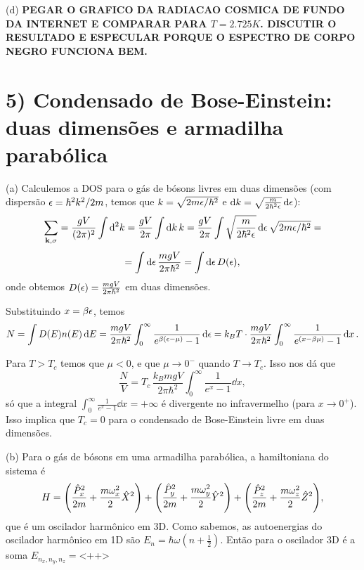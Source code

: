 \documentclass[a4paper,10pt]{article}
\begin{document}
\n\n

(d) \textbf{PEGAR O GRAFICO DA RADIACAO COSMICA DE FUNDO DA INTERNET E COMPARAR PARA $T = 2.725 \unit{K}$. DISCUTIR O RESULTADO E ESPECULAR PORQUE O ESPECTRO DE CORPO NEGRO FUNCIONA BEM.}


\pagebreak

\section*{5) Condensado de Bose-Einstein: duas dimensões e armadilha parabólica}

(a) Calculemos a DOS para o gás de bósons livres em duas dimensões (com dispersão $\epsilon = \hbar^2 k^2 / 2m$, temos que
$k = \sqrt{2m\epsilon/\hbar^2}$ e $\dd{k} = \sqrt{\frac{m}{2\hbar^2\epsilon}} \dd{\epsilon}$):
$$
\sum_{\vb{k}, \sigma} = \frac{g V}{(2\pi)^2} \int \dd[2] k = \frac{gV}{2\pi} \int \dd{k} k =
\frac{gV}{2\pi} \int \sqrt{\frac{m}{2\hbar^2\epsilon}} \dd{\epsilon} \sqrt{2m\epsilon/\hbar^2} =
$$
$$
= \int \dd{\epsilon} \frac{mgV}{2\pi \hbar^2} = \int \dd{\epsilon} D(\epsilon),
$$
onde obtemos $D(\epsilon) = \frac{mgV}{2\pi \hbar^2}$ em duas dimensões.

\n

Substituindo $x = \beta \epsilon$, temos
$$
N = \int D(E) n(E) \dd{E} = \frac{m g V}{2\pi \hbar^2} \int_0^{\infty} \frac{1}{e^{\beta (\epsilon-\mu)} - 1} \dd{\epsilon} =
k_B T \cdot \frac{m g V}{2\pi \hbar^2} \int_0^{\infty} \frac{1}{e^{(x - \beta\mu)} - 1} \dd{x}.
$$

\n

Para $T > T_c$ temos que $\mu < 0$, e que $\mu \to 0^-$ quando $T \to T_c$. Isso nos dá que
$$
\frac{N}{V} = T_c \, \frac{k_B m g V}{2\pi \hbar^2} \int_0^{\infty} \frac{1}{e^{x} - 1} \dd{x},
$$
só que a integral $\int_0^{\infty} \frac{1}{e^{x} - 1} \dd{x} = +\infty$ é divergente no infravermelho (para $x \to 0^+$). Isso implica que $\boxed{T_c = 0}$ para o condensado de Bose-Einstein livre em duas dimensões.

\n

(b) Para o gás de bósons em uma armadilha parabólica, a hamiltoniana do sistema é
$$
H = \qty(\frac{\hat{P}_x^2}{2m} + \frac{m \omega_x^2}{2} \hat{X}^2) +
\qty(\frac{\hat{P}_y^2}{2m} + \frac{m \omega_y^2}{2} \hat{Y}^2) +
\qty(\frac{\hat{P}_z^2}{2m} + \frac{m \omega_z^2}{2} \hat{Z}^2),
$$
que é um oscilador harmônico em 3D. Como sabemos, as autoenergias do oscilador harmônico em 1D são $E_n = \hbar\omega(n+\frac{1}{2})$. Então para o oscilador 3D é a soma $E_{n_x, n_y, n_z} = $<++>

\pagebreak
\end{document}
